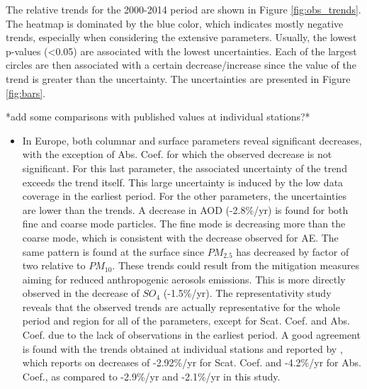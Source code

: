 \documentclass[journal abbreviation, manuscript]{copernicus}
\begin{document}
The relative trends for the 2000-2014 period are shown in Figure \ref{fig:obs_trends}. The heatmap is dominated by the blue color, which indicates mostly negative trends, especially when considering the extensive parameters. Usually, the lowest p-values (<0.05) are associated with the lowest uncertainties. Each of the largest circles are then associated with a certain decrease/increase since the value of the trend is greater than the uncertainty. The uncertainties are presented in Figure \ref{fig:bars}.

*add some comparisons with published values at individual stations?*
\begin{itemize}
 \item In Europe, both columnar and surface parameters reveal significant decreases, with the exception of Abs. Coef. for which the observed decrease is not significant. For this last parameter, the associated uncertainty of the trend exceeds the trend itself. This large uncertainty is induced by the low data coverage in the earliest period. For the other parameters, the uncertainties are lower than the trends. A decrease in AOD (-2.8\%/yr) is found for both fine and coarse mode particles. The fine mode is decreasing more than the coarse mode, which is consistent with the decrease observed for AE. The same pattern is found at the surface since $PM_{2.5}$ has decreased by factor of two relative to $PM_{10}$. These trends could result from the mitigation measures aiming for reduced anthropogenic aerosols emissions. This is more directly observed in the decrease of $SO_{4}$ (-1.5\%/yr). The representativity study reveals that the observed trends are actually representative for the whole period and region for all of the parameters, except for Scat. Coef. and Abs. Coef. due to the lack of observations in the earliest period. A good agreement is found with the trends obtained at individual stations and reported by \cite{collaudcoenprep}, which reports on decreases of -2.92\%/yr for Scat. Coef. and -4.2\%/yr for Abs. Coef., as compared to -2.9\%/yr and -2.1\%/yr in this study.

\end{itemize}
\end{document}
